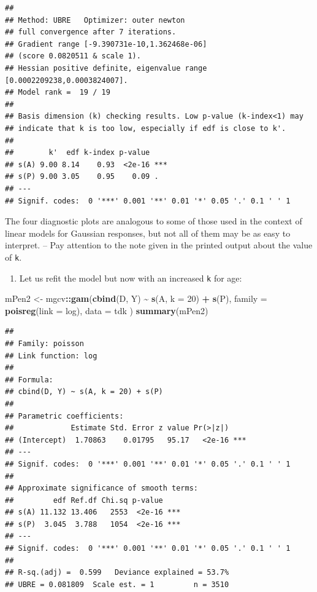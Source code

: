 \documentclass[
]{book}
\newenvironment{Shaded}{\begin{snugshade}}{\end{snugshade}}
\newcommand{\AttributeTok}[1]{\textcolor[rgb]{0.13,0.29,0.53}{#1}}
\newcommand{\DecValTok}[1]{\textcolor[rgb]{0.00,0.00,0.81}{#1}}
\newcommand{\FunctionTok}[1]{\textcolor[rgb]{0.13,0.29,0.53}{\textbf{#1}}}
\newcommand{\NormalTok}[1]{#1}
\newcommand{\OtherTok}[1]{\textcolor[rgb]{0.56,0.35,0.01}{#1}}
\newcommand{\SpecialCharTok}[1]{\textcolor[rgb]{0.81,0.36,0.00}{\textbf{#1}}}
\providecommand{\tightlist}{%
  \setlength{\itemsep}{0pt}\setlength{\parskip}{0pt}}
\begin{document}
\begin{verbatim}
## 
## Method: UBRE   Optimizer: outer newton
## full convergence after 7 iterations.
## Gradient range [-9.390731e-10,1.362468e-06]
## (score 0.0820511 & scale 1).
## Hessian positive definite, eigenvalue range [0.0002209238,0.0003824007].
## Model rank =  19 / 19 
## 
## Basis dimension (k) checking results. Low p-value (k-index<1) may
## indicate that k is too low, especially if edf is close to k'.
## 
##        k'  edf k-index p-value    
## s(A) 9.00 8.14    0.93  <2e-16 ***
## s(P) 9.00 3.05    0.95    0.09 .  
## ---
## Signif. codes:  0 '***' 0.001 '**' 0.01 '*' 0.05 '.' 0.1 ' ' 1
\end{verbatim}

The four diagnostic plots are analogous to some of those used in
the context of linear models for Gaussian responses, but not all of them
may be as easy to interpret. -- Pay attention to the note
given in the printed output about the value of \texttt{k}.

\begin{enumerate}
\def\labelenumi{\arabic{enumi}.}
\setcounter{enumi}{3}
\tightlist
\item
  Let us refit the model but now with an increased \texttt{k} for age:
\end{enumerate}

\begin{Shaded}
\begin{Highlighting}[]
\NormalTok{mPen2 }\OtherTok{\textless{}{-}}\NormalTok{ mgcv}\SpecialCharTok{::}\FunctionTok{gam}\NormalTok{(}\FunctionTok{cbind}\NormalTok{(D, Y) }\SpecialCharTok{\textasciitilde{}} \FunctionTok{s}\NormalTok{(A, }\AttributeTok{k =} \DecValTok{20}\NormalTok{) }\SpecialCharTok{+} \FunctionTok{s}\NormalTok{(P),}
  \AttributeTok{family =} \FunctionTok{poisreg}\NormalTok{(}\AttributeTok{link =}\NormalTok{ log), }\AttributeTok{data =}\NormalTok{ tdk}
\NormalTok{)}
\FunctionTok{summary}\NormalTok{(mPen2)}
\end{Highlighting}
\end{Shaded}

\begin{verbatim}
## 
## Family: poisson 
## Link function: log 
## 
## Formula:
## cbind(D, Y) ~ s(A, k = 20) + s(P)
## 
## Parametric coefficients:
##             Estimate Std. Error z value Pr(>|z|)    
## (Intercept)  1.70863    0.01795   95.17   <2e-16 ***
## ---
## Signif. codes:  0 '***' 0.001 '**' 0.01 '*' 0.05 '.' 0.1 ' ' 1
## 
## Approximate significance of smooth terms:
##         edf Ref.df Chi.sq p-value    
## s(A) 11.132 13.406   2553  <2e-16 ***
## s(P)  3.045  3.788   1054  <2e-16 ***
## ---
## Signif. codes:  0 '***' 0.001 '**' 0.01 '*' 0.05 '.' 0.1 ' ' 1
## 
## R-sq.(adj) =  0.599   Deviance explained = 53.7%
## UBRE = 0.081809  Scale est. = 1         n = 3510
\end{verbatim}
\end{document}
